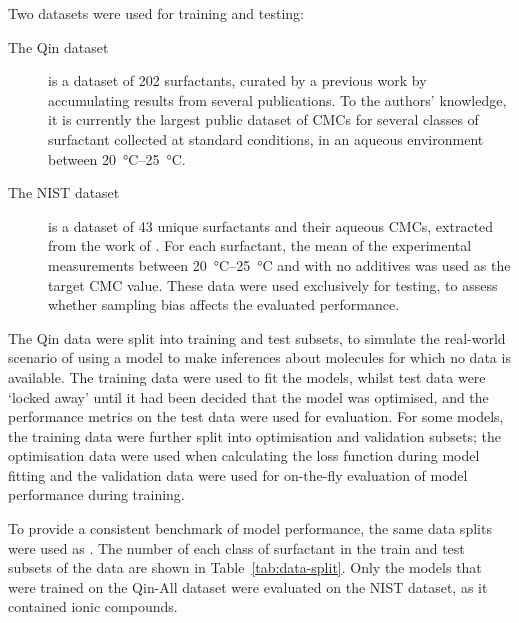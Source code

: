 \newcommand{\lrv}{\vec{v}^{\,(p)}}

Two datasets were used for training and testing:

\begin{description}
    \item[The Qin dataset] is a dataset of 202 surfactants, curated by a
          previous work \cite{qinPredictingCriticalMicelle2021} by accumulating
          results from several publications. To the authors' knowledge, it is
          currently the largest public dataset of CMCs for several classes of
          surfactant collected at standard conditions, in an aqueous environment
          between \SIrange{20}{25}{\celsius}.
    \item[The NIST dataset] is a dataset of 43 unique surfactants and their
          aqueous CMCs, extracted from the work of
          \citet{mukerjeeCriticalMicelleConcentrations1971}. For each
          surfactant, the mean of the experimental measurements between
          \SIrange{20}{25}{\degreeCelsius} and with no additives was used as the
          target CMC value. These data were used exclusively for testing, to
          assess whether sampling bias affects the evaluated performance.
\end{description}

The Qin data were split into training and test subsets, to simulate the
real-world scenario of using a model to make inferences about molecules for
which no data is available. The training data were used to fit the models,
whilst test data were `locked away' until it had been decided that the model was
optimised, and the performance metrics on the test data were used for
evaluation. For some models, the training data were further split into
optimisation and validation subsets; the optimisation data were used when
calculating the loss function during model fitting and the validation data were
used for on-the-fly evaluation of model performance during training.

To provide a consistent benchmark of model performance, the same data splits
were used as \citet{qinPredictingCriticalMicelle2021}. The number of each class
of surfactant in the train and test subsets of the data are shown in
Table~\ref{tab:data-split}. Only the models that were trained on the Qin-All
dataset were evaluated on the NIST dataset, as it contained ionic compounds.


